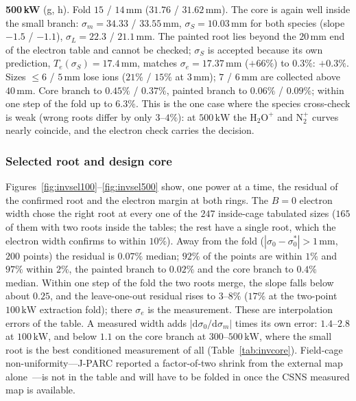 \documentclass[hyperref]{cernrep}
\begin{document}
\noindent\textbf{500\,kW} (g, h). Fold $15$ / $14\,\mathrm{mm}$
($31.76$ / $31.62\,\mathrm{mm}$). The core is again well inside the
small branch: $\sigma_m=34.33$ / $33.55\,\mathrm{mm}$,
$\sigma_S=10.03\,\mathrm{mm}$ for both species (slope $-1.5$ /
$-1.1$), $\sigma_L=22.3$ / $21.1\,\mathrm{mm}$. The painted root lies beyond
the $20\,\mathrm{mm}$ end of the electron table and cannot be checked;
$\sigma_S$ is accepted because its own prediction,
$T_e(\sigma_S)=17.4\,\mathrm{mm}$, matches $\sigma_e=17.37\,\mathrm{mm}$
($+66\%$) to $0.3\%$: $+0.3\%$. Sizes $\le 6$ / $5\,\mathrm{mm}$
lose ions ($21\%$ / $15\%$ at $3\,\mathrm{mm}$); $7$ / $6\,\mathrm{mm}$
are collected above $40\,\mathrm{mm}$. Core branch to
$0.45\%$ / $0.37\%$, painted branch to $0.06\%$ / $0.09\%$; within one step of the
fold up to $6.3\%$. This is the one case where the species
cross-check is weak (wrong roots differ by only $3$--$4\%$): at
$500\,\mathrm{kW}$ the $\mathrm{H}_2\mathrm{O}^+$ and $\mathrm{N}_2^+$
curves nearly coincide, and the electron check carries the decision.

\subsubsection{Selected root and design core}

Figures~\ref{fig:invsel100}--\ref{fig:invsel500} show, one power at a
time, the residual of the confirmed root and the electron margin at
both rings. The $B=0$
electron width chose the right root at every one of the $247$
inside-cage tabulated sizes ($165$ of them with two roots inside the
tables; the rest have a single root, which the electron width confirms
to within $10\%$). Away from the fold
($|\sigma_0-\sigma_0^*|>1\,\mathrm{mm}$, $200$ points) the residual
is $0.07\%$ median; $92\%$ of the points are within $1\%$ and $97\%$
within $2\%$, the painted branch to $0.02\%$ and the core branch to
$0.4\%$ median. Within one step of the fold the two roots merge, the
slope falls below about $0.25$, and the leave-one-out residual rises
to $3$--$8\%$ ($17\%$ at the two-point $100\,\mathrm{kW}$ extraction
fold); there $\sigma_e$ is the measurement. These are interpolation
errors of the table. A measured width adds
$|\mathrm{d}\sigma_0/\mathrm{d}\sigma_m|$ times its own error:
$1.4$--$2.8$ at $100\,\mathrm{kW}$, and below $1.1$ on the core branch
at $300$--$500\,\mathrm{kW}$, where the small root is the best
conditioned measurement of all (Table~\ref{tab:invcore}). Field-cage
non-uniformity---J-PARC reported a factor-of-two shrink from the
external map alone~\cite{Satou2010}---is not in the table and will
have to be folded in once the CSNS measured map is available.
\end{document}
